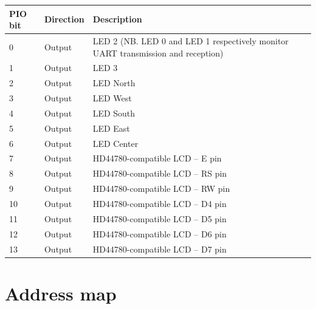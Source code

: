 \documentclass[a4paper,11pt]{article}
\begin{document}
\begin{tabularx}{\textwidth}{|l|l|X|}
\hline
\bf{PIO bit} & \bf{Direction} & \bf{Description} \\
\hline
0 & Output & LED 2 (NB. LED 0 and LED 1 respectively monitor UART transmission and reception) \\
\hline
1 & Output & LED 3 \\
\hline
2 & Output & LED North \\
\hline
3 & Output & LED West \\
\hline
4 & Output & LED South \\
\hline
5 & Output & LED East \\
\hline
6 & Output & LED Center \\
\hline
7 & Output & HD44780-compatible LCD -- E pin \\
\hline
8 & Output & HD44780-compatible LCD -- RS pin \\
\hline
9 & Output & HD44780-compatible LCD -- RW pin \\
\hline
10 & Output & HD44780-compatible LCD -- D4 pin \\
\hline
11 & Output & HD44780-compatible LCD -- D5 pin \\
\hline
12 & Output & HD44780-compatible LCD -- D6 pin \\
\hline
13 & Output & HD44780-compatible LCD -- D7 pin \\
\hline
\end{tabularx}

\section{Address map}
\end{document}
